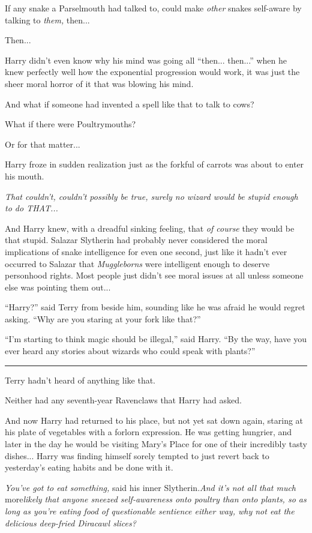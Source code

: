If any snake a Parselmouth had talked to, could make \emph{other} snakes
self-aware by talking to \emph{them,} then...

Then...

Harry didn't even know why his mind was going all ``then...
then...'' when he knew perfectly well how the exponential
progression would work, it was just the sheer moral horror of it that
was blowing his mind.

And what if someone had invented a spell like that to talk to cows?

What if there were Poultrymouths?

Or for that matter...

Harry froze in sudden realization just as the forkful of carrots was
about to enter his mouth.

\emph{That couldn't, couldn't possibly be true, surely no wizard would
be stupid enough to do THAT...}

And Harry knew, with a dreadful sinking feeling, that \emph{of course}
they would be that stupid. Salazar Slytherin had probably never
considered the moral implications of snake intelligence for even one
second, just like it hadn't ever occurred to Salazar that
\emph{Muggleborns} were intelligent enough to deserve personhood rights.
Most people just didn't see moral issues at all unless someone else was
pointing them out...

``Harry?'' said Terry from beside him, sounding like he was afraid he
would regret asking. ``Why are you staring at your fork like that?''

``I'm starting to think magic should be illegal,'' said Harry. ``By the
way, have you ever heard any stories about wizards who could speak with
plants?''

\begin{center}\rule{3in}{0.4pt}\end{center}

Terry hadn't heard of anything like that.

Neither had any seventh-year Ravenclaws that Harry had asked.

And now Harry had returned to his place, but not yet sat down again,
staring at his plate of vegetables with a forlorn expression. He was
getting hungrier, and later in the day he would be visiting Mary's Place
for one of their incredibly tasty dishes... Harry was finding
himself sorely tempted to just revert back to yesterday's eating habits
and be done with it.

\emph{You've got to eat something,} said his inner Slytherin.\emph{And
it's not all that much} more\emph{likely that anyone sneezed
self-awareness onto poultry than onto plants, so as long as you're
eating food of questionable sentience either way, why not eat the
delicious deep-fried Diracawl slices?}

